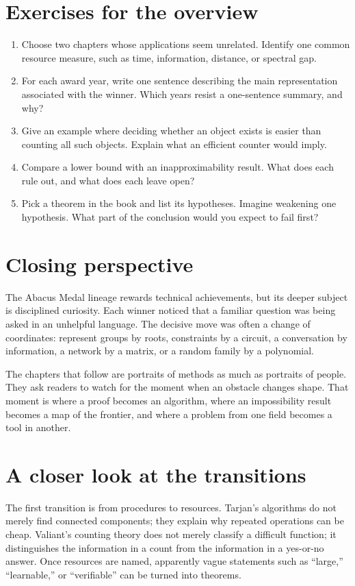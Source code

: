 \section{Exercises for the overview}
\begin{enumerate}[label=\textbf{E\arabic*.}]
\item Choose two chapters whose applications seem unrelated. Identify one common resource measure, such as time, information, distance, or spectral gap.
\item For each award year, write one sentence describing the main representation associated with the winner. Which years resist a one-sentence summary, and why?
\item Give an example where deciding whether an object exists is easier than counting all such objects. Explain what an efficient counter would imply.
\item Compare a lower bound with an inapproximability result. What does each rule out, and what does each leave open?
\item Pick a theorem in the book and list its hypotheses. Imagine weakening one hypothesis. What part of the conclusion would you expect to fail first?
\end{enumerate}

\section{Closing perspective}
The Abacus Medal lineage rewards technical achievements, but its deeper subject is disciplined curiosity. Each winner noticed that a familiar question was being asked in an unhelpful language. The decisive move was often a change of coordinates: represent groups by roots, constraints by a circuit, a conversation by information, a network by a matrix, or a random family by a polynomial.

The chapters that follow are portraits of methods as much as portraits of people. They ask readers to watch for the moment when an obstacle changes shape. That moment is where a proof becomes an algorithm, where an impossibility result becomes a map of the frontier, and where a problem from one field becomes a tool in another.

\section{A closer look at the transitions}
The first transition is from procedures to resources. Tarjan's algorithms do not merely find connected components; they explain why repeated operations can be cheap. Valiant's counting theory does not merely classify a difficult function; it distinguishes the information in a count from the information in a yes-or-no answer. Once resources are named, apparently vague statements such as ``large,'' ``learnable,'' or ``verifiable'' can be turned into theorems.

